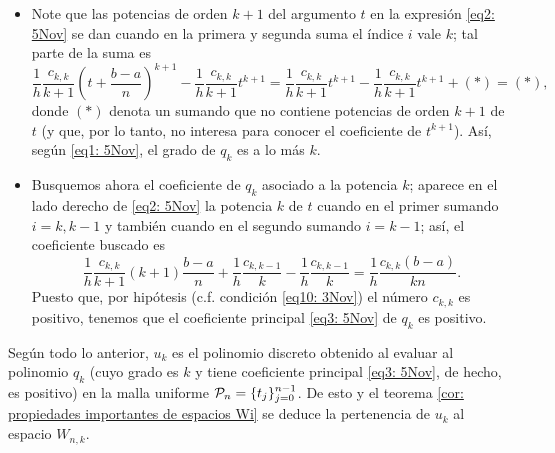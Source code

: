 \begin{itemize}
\item Note que las potencias de orden $k+1$ del argumento
$t$ en la expresión \eqref{eq2: 5Nov}
se dan
cuando en la primera y segunda suma el índice $i$
vale $k$; 
tal parte de la suma es 
\begin{equation}
\label{eq1: 5Nov}
\frac{1}{h} \frac{c_{k,k}}{k+1} \left(t+\frac{b-a}{n} \right)^{k+1}-
\frac{1}{h} \frac{c_{k,k}}{k+1} t^{k+1}=
\frac{1}{h} \frac{c_{k,k}}{k+1} t^{k+1}-\frac{1}{h} \frac{c_{k,k}}{k+1} t^{k+1}+ (*)=(*),
\end{equation} 
donde $(*)$ denota un sumando que no contiene potencias de orden
$k+1$ de $t$ (y que, por lo tanto, no interesa para conocer
el coeficiente de $t^{k+1}$).
Así, según \eqref{eq1: 5Nov}, el grado
de $q_{k}$ es a lo más $k$.
\item Busquemos ahora el coeficiente de $q_{k}$ asociado a la
potencia $k$; aparece en
el lado derecho de \eqref{eq2: 5Nov} la potencia $k$
de $t$ cuando en el primer sumando $i=k, k-1$
y también cuando en el segundo sumando $i=k-1$;
así, el coeficiente buscado es
\begin{equation}
\label{eq3: 5Nov}
\frac{1}{h} \frac{c_{k,k}}{k+1}(k+1)\frac{b-a}{n} 
+\frac{1}{h} \frac{c_{k,k-1}}{k}-
\frac{1}{h} \frac{c_{k,k-1}}{k} = 
\frac{1}{h} \frac{c_{k,k}(b-a)}{kn}.
\end{equation}
Puesto que, por hipótesis (c.f. 
condición \eqref{eq10: 3Nov})
el número $c_{k,k}$ es positivo, tenemos que 
el coeficiente principal \ref{eq3: 5Nov}
de $q_{k}$ es positivo.
\end{itemize}


Según todo lo anterior, $u_{k}$
es el polinomio discreto obtenido al evaluar
al polinomio $q_{k}$ (cuyo grado es $k$ y tiene
coeficiente principal \eqref{eq3: 5Nov},
de hecho, es positivo)
en la malla uniforme 
$\mathcal{P}_{n}=\{t_{j}\}_{j=0}^{n-1}$.
De esto y el teorema 
\ref{cor: propiedades importantes de espacios Wi}
se deduce la pertenencia de $u_{k}$ al espacio $W_{n,k}$.
\QEDB
\vspace{0.2cm}

